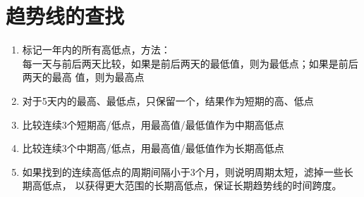 \chapter{趋势线的查找}

\begin{enumerate}
\item 标记一年内的所有高低点，方法： \\
  每一天与前后两天比较，如果是前后两天的最低值，则为最低点；如果是前后两天的最高
  值，则为最高点
\item 对于5天内的最高、最低点，只保留一个，结果作为短期的高、低点
\item 比较连续3个短期高/低点，用最高值/最低值作为中期高低点
\item 比较连续3个中期高/低点，用最高值/最低值作为长期高低点
\item 如果找到的连续高低点的周期间隔小于3个月，则说明周期太短，滤掉一些长期高低点，
  以获得更大范围的长期高低点，保证长期趋势线的时间跨度。
\end{enumerate}


